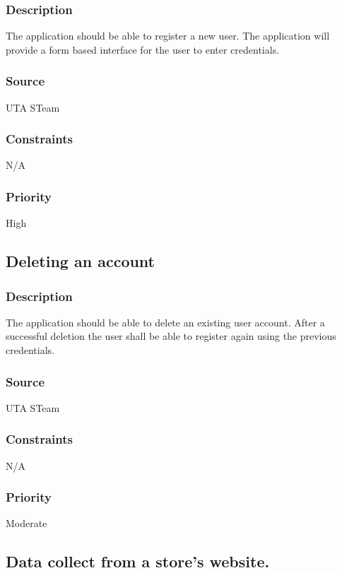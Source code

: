 \subsubsection{Description}
The application should be able to register a new user. The application will provide a form based interface for the user to enter credentials.
\subsubsection{Source}
UTA STeam
\subsubsection{Constraints}
N/A
\subsubsection{Priority}
High
\subsection{Deleting an account}
\subsubsection{Description}
The application should be able to delete an existing user account. After a successful deletion the user shall be able to register again using the previous credentials. 
\subsubsection{Source}
UTA STeam
\subsubsection{Constraints}
N/A
\subsubsection{Priority}
Moderate
\subsection{Data collect from a store's website.}
